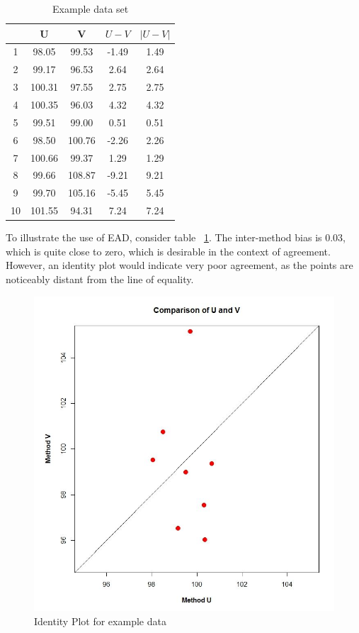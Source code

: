 \documentclass[12pt, a4paper]{report}
\theoremstyle{plain}
\theoremstyle{definition}
\theoremstyle{remark}
\begin{document}
	
	
	
	\begin{table}[ht]
		\centering
		\begin{tabular}{|c|c|c|c|c|}
			\hline
			& U & V & $U-V$ & $|U-V|$ \\ 
			\hline
			1 & 98.05 & 99.53 & -1.49 & 1.49 \\ 
			2 & 99.17 & 96.53 & 2.64 & 2.64 \\ 
			3 & 100.31 & 97.55 & 2.75 & 2.75 \\ 
			4 & 100.35 & 96.03 & 4.32 & 4.32 \\ 
			5 & 99.51 & 99.00 & 0.51 & 0.51 \\ 
			6 & 98.50 & 100.76 & -2.26 & 2.26 \\ 
			7 & 100.66 & 99.37 & 1.29 & 1.29 \\ 
			8 & 99.66 & 108.87 & -9.21 & 9.21 \\ 
			9 & 99.70 & 105.16 & -5.45 & 5.45 \\ 
			10 & 101.55 & 94.31 & 7.24 & 7.24 \\ 
			\hline
		\end{tabular}
		\caption{Example data set}
		\label{EADdata}
	\end{table}
	
	To illustrate the use of EAD, consider table ~\ref{EADdata}. The inter-method bias is 0.03, which is quite close to zero, which is desirable in the context of agreement. However, an identity plot would indicate very poor agreement, as the points are noticeably distant from the line of equality.
	\begin{figure}
		\centering
		\includegraphics[width=0.7\linewidth]{EAD-UV}
		\caption{Identity Plot for example data}
		\label{fig:EADidentity}
	\end{figure}
	
\end{document}
